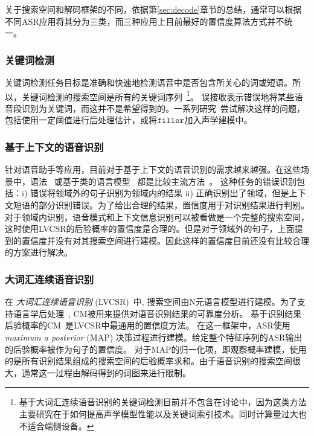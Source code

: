   关于搜索空间和解码框架的不同，依据第\ref{sec:decode}章节的总结，通常可以根据不同ASR应用将其分为三类，而三种应用上目前最好的置信度算法方式并不统一。

  \subsubsection{关键词检测}
    \label{Sec:kws-task}

      关键词检测任务目标是准确和快速地检测语音中是否包含所关心的词或短语。所以，关键词检测的搜索空间是所有的关键词序列~\footnote{基于大词汇连续语音识别的关键词检测目前并不包含在讨论中，因为这类方法主要研究在于如何提高声学模型性能以及关键词索引技术。同时计算量过大也不适合端侧设备。}。 误接收表示错误地将某些语音段识别为关键词，而这并不是希望得到的。一系列研究~\cite{young1994detecting,chen2014small}尝试解决这样的问题，包括使用一定阈值进行后处理估计，或将$\tt filler$加入声学建模中。

  \subsubsection{基于上下文的语音识别}
  \label{Sec:task-task}

  针对语音助手等应用，目前对于基于上下文的语音识别的需求越来越强。在这些场景中，语法~\cite{woodland1994large} 或基于类的语言模型~\cite{ward1996class} 都是比较主流方法~\cite{vasserman2016contextual}。
  这种任务的错误识别包括：i) 错误将领域外的句子识别为领域内的结果 ii) 正确识别出了领域，但是上下文短语的部分识别错误。为了给出合理的结果，置信度用于对识别结果进行判别。对于领域内识别，语音模式和上下文信息识别可以被看做是一个完整的搜索空间，这时使用LVCSR的后验概率的置信度是合理的。但是对于领域外的句子，上面提到的置信度并没有对其搜索空间进行建模。因此这样的置信度目前还没有比较合理的方案进行解决。

  \subsubsection{大词汇连续语音识别}
  \label{Sec:lvcsr-task}

  在 {\em 大词汇连续语音识别} (LVCSR)~\cite{woodland1994large}中,  搜索空间由N元语言模型进行建模。为了支持语言学后处理~\cite{hakkani2006beyond}, CM被用来提供对语音识别结果的可靠度分析。
  基于识别结果后验概率的CM~\cite{wessel2001confidence}是LVCSR中最通用的置信度方法。
  在这一框架中，ASR使用 {\em maximum a posterior} (MAP) 决策过程进行建模。给定整个特征序列的ASR输出的后验概率被作为句子的置信度。 对于MAP的归一化项，即观察概率建模，使用的是所有识别结果组成的搜索空间的后验概率求和。由于语音识别的搜索空间很大，通常这一过程由解码得到的词图来进行限制。


